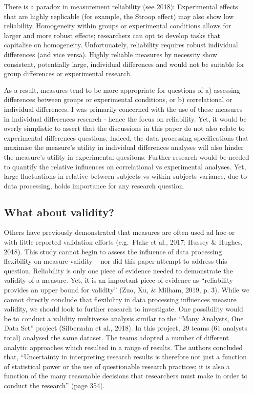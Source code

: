 \documentclass[
  english,
  man,floatsintext]{apa6}
\begin{document}
There is a paradox in measurement reliability (see 2018): Experimental effects that are highly replicable (for example, the Stroop effect) may also show low reliability. Homogeneity within groups or experimental conditions allows for larger and more robust effects; researchers can opt to develop tasks that capitalise on homogeneity. Unfortunately, reliability requires robust individual differences (and vice versa). Highly reliable measures by necessity show consistent, potentially large, individual differences and would not be suitable for group differences or experimental research.

As a result, measures tend to be more appropriate for questions of a) assessing differences between groups or experimental conditions, or b) correlational or individual differences. I was primarily concerned with the use of these measures in individual differences research - hence the focus on reliability. Yet, it would be overly simplistic to assert that the discussions in this paper do not also relate to experimental differences questions. Indeed, the data processing specifications that maximise the measure's utility in individual differences analyses will also hinder the measure's utility in experimental quesitons. Further research would be needed to quantify the relative influences on correlational vs experimental analyses. Yet, large fluctuations in relative between-subjects vs within-subjects variance, due to data processing, holds importance for any research question.

\hypertarget{what-about-validity}{%
\subsection{What about validity?}\label{what-about-validity}}

Others have previously demonstrated that measures are often used ad hoc or with little reported validation efforts (e.g.~Flake et al., 2017; Hussey \& Hughes, 2018). This study cannot begin to assess the influence of data processing flexibility on measure validity -- nor did this paper attempt to address this question. Reliability is only one piece of evidence needed to demonstrate the validity of a measure. Yet, it is an important piece of evidence as \enquote{reliability provides an upper bound for validity} (Zuo, Xu, \& Milham, 2019, p. 3). While we cannot directly conclude that flexibility in data processing influences measure validity, we should look to further research to investigate. One possibility would be to conduct a validity multiverse analysis similar to the \enquote{Many Analysts, One Data Set} project (Silberzahn et al., 2018). In this project, 29 teams (61 analysts total) analysed the same dataset. The teams adopted a number of different analytic approaches which resulted in a range of results. The authors concluded that, \enquote{Uncertainty in interpreting research results is therefore not just a function of statistical power or the use of questionable research practices; it is also a function of the many reasonable decisions that researchers must make in order to conduct the research} (page 354).
\end{document}

